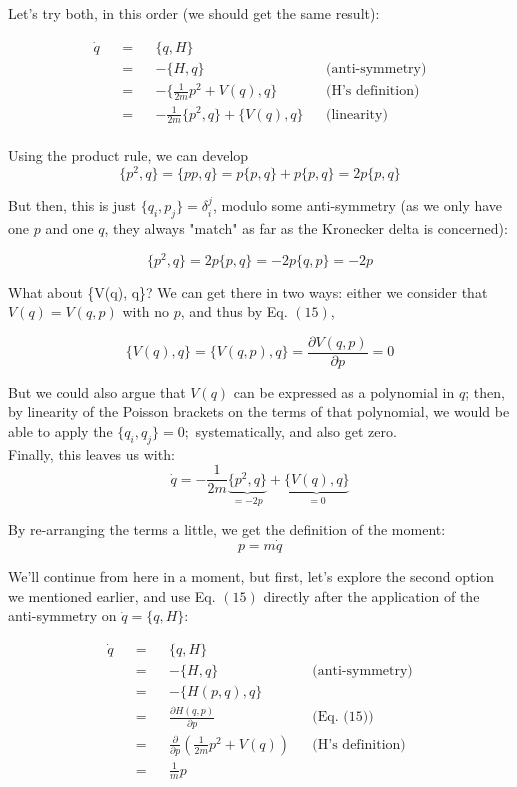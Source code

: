 \documentclass[solutions.tex]{subfiles}
\begin{document}
Let's try both, in this order (we should get the same result):

\begin{equation*}\begin{aligned}
	\dot{q} &&=&& \{q, H\} && ~ \\
	~ &&=&& -\{H, q\} && \text{(anti-symmetry)} \\
	~ &&=&& -\{\frac1{2m}p^2+V(q), q\} && \text{(H's definition)} \\
	~ &&=&& -\frac1{2m}\{p^2, q\} + \{V(q), q\} && \text{(linearity)} \\
\end{aligned}\end{equation*}

Using the product rule, we can develop
\[	\{p^2, q\} = \{ p p, q \} = p \{ p, q \} + p \{ p, q \} = 2p\{p, q\} \]

But then, this is just $\{ q_i, p_j \} = \delta_i^j$, modulo some
anti-symmetry (as we only have one $p$ and one $q$, they always "match"
as far as the Kronecker delta is concerned):

\[ \{p^2, q\} = 2p\{p, q\} = -2p\{q, p\} = -2p \]

What about \{V(q), q\}? We can get there in two ways: either we consider
that $V(q) = V(q, p)$ with no $p$, and thus by Eq. $(15)$,

\[ \{V(q), q\} = \{V(q, p), q\} = \frac{\partial V(q, p)}{\partial p} = 0 \]

But we could also argue that $V(q)$ can be expressed as a polynomial in $q$;
then, by linearity of the Poisson brackets on the terms of that polynomial,
we would be able to apply the $\{ q_i, q_j \} = 0;$ systematically, and
also get zero. \\

Finally, this leaves us with:
\[
	\dot{q} = -\frac1{2m}\underbrace{\{p^2, q\}}_{=-2p} + \underbrace{\{V(q), q\}}_{=0}
\]

By re-arranging the terms a little, we get the definition of the moment:
\[
	\boxed{p = m\dot{q}}
\]

We'll continue from here in a moment, but first, let's explore the second
option we mentioned earlier, and use Eq. $(15)$ directly after the application
of the anti-symmetry on $\dot{q} = \{q, H\}$:

\begin{equation*}\begin{aligned}
	\dot{q} &&=&& \{q, H\} && ~ \\
	~ &&=&& -\{H, q\} && \text{(anti-symmetry)} \\
	~ &&=&& -\{H(p, q), q\} && ~ \\
	~ &&=&& \frac{\partial H(q, p)}{\partial p} && \text{(Eq. (15))} \\
	~ &&=&& \frac{\partial}{\partial p}\left(\frac1{2m}p^2+V(q)\right) && \text{(H's definition)} \\
	~ &&=&& \frac1m p
\end{aligned}\end{equation*}
\end{document}
